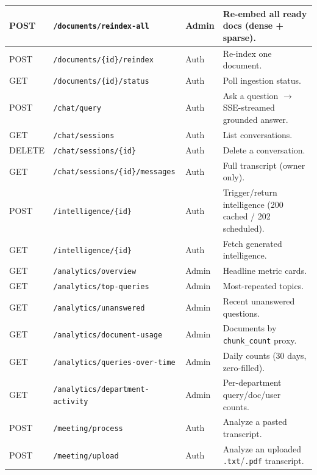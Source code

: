 \documentclass[11pt,a4paper,oneside]{report}
\newcommand{\code}[1]{\texttt{#1}}
\begin{document}
\begin{small}
\begin{longtable}{|L{1.5cm}|L{4.8cm}|C{1.2cm}|L{6.4cm}|}
POST & \code{/documents/reindex-all} & Admin & Re-embed all ready docs (dense + sparse).\\ \hline
POST & \code{/documents/\{id\}/reindex} & Auth & Re-index one document.\\ \hline
GET & \code{/documents/\{id\}/status} & Auth & Poll ingestion status.\\ \hline
POST & \code{/chat/query} & Auth & Ask a question $\to$ SSE-streamed grounded answer.\\ \hline
GET & \code{/chat/sessions} & Auth & List conversations.\\ \hline
DELETE & \code{/chat/sessions/\{id\}} & Auth & Delete a conversation.\\ \hline
GET & \code{/chat/sessions/\{id\}/messages} & Auth & Full transcript (owner only).\\ \hline
POST & \code{/intelligence/\{id\}} & Auth & Trigger/return intelligence (200 cached / 202 scheduled).\\ \hline
GET & \code{/intelligence/\{id\}} & Auth & Fetch generated intelligence.\\ \hline
GET & \code{/analytics/overview} & Admin & Headline metric cards.\\ \hline
GET & \code{/analytics/top-queries} & Admin & Most-repeated topics.\\ \hline
GET & \code{/analytics/unanswered} & Admin & Recent unanswered questions.\\ \hline
GET & \code{/analytics/document-usage} & Admin & Documents by \code{chunk\_count} proxy.\\ \hline
GET & \code{/analytics/queries-over-time} & Admin & Daily counts (30 days, zero-filled).\\ \hline
GET & \code{/analytics/department-activity} & Admin & Per-department query/doc/user counts.\\ \hline
POST & \code{/meeting/process} & Auth & Analyze a pasted transcript.\\ \hline
POST & \code{/meeting/upload} & Auth & Analyze an uploaded \code{.txt}/\code{.pdf} transcript.\\ \hline
\end{longtable}
\end{small}
\end{document}
